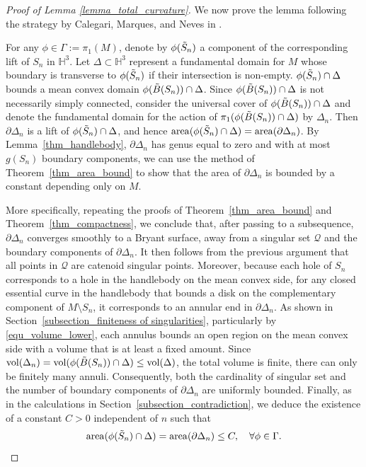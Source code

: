 \documentclass[12pt,a4paper]{amsart}
\numberwithin{equation}{section}
\theoremstyle{plain}
\theoremstyle{named}
\theoremstyle{definition}
\newcommand{\area}{{\rm{area}}}
\newcommand{\vol}{{\rm{vol}}}
\begin{document}
\begin{proof}[Proof of Lemma \ref{lemma_total_curvature}]
We now prove the lemma following the strategy by Calegari, Marques, and Neves in \cite[Section 6]{Calegari-Marques-Neves}.

For any $\phi\in \Gamma:=\pi_1(M)$, denote by $\phi(\Tilde{S}_n)$ a component of the corresponding lift of $S_n$ in $\mathbb{H}^3$. Let $\Delta\subset \mathbb{H}^3$ represent a fundamental domain for $M$ whose boundary is transverse to $\phi(\Tilde{S}_n)$ if their intersection is non-empty. $\phi(\Tilde{S}_n)\cap\Delta$ bounds a mean convex domain $\phi(\Tilde{B}(S_n))\cap\Delta$. Since  $\phi(\Tilde{B}(S_n))\cap\Delta$ is not necessarily simply connected, consider the universal cover of $\phi(\Tilde{B}(S_n))\cap\Delta$ and denote the fundamental domain for the action of $\pi_1(\phi(\Tilde{B}(S_n))\cap\Delta)$ by $\Delta_n$. Then $\partial\Delta_n$ is a lift of $\phi(\Tilde{S}_n)\cap\Delta$, and hence $\area(\phi(\Tilde{S}_n)\cap\Delta)=\area(\partial \Delta_n)$.
By Lemma~\ref{thm_handlebody}, $\partial\Delta_n$ has genus equal to zero and with at most $g(S_n)$ boundary components, we can use the method of Theorem~\ref{thm_area_bound} to show that the area of $\partial \Delta_n$ is bounded by a constant depending only on $M$.

More specifically, repeating the proofs of Theorem~\ref{thm_area_bound} and Theorem~\ref{thm_compactness}, we conclude that, after passing to a subsequence, $\partial \Delta_n$ converges smoothly to a Bryant surface, away from a singular set $\mathcal{Q}$ and the boundary components of $\partial\Delta_n$. It then follows from the previous argument that all points in $\mathcal{Q}$ are catenoid singular points. 
Moreover, because each hole of $S_n$ corresponds to a hole in the handlebody on the mean convex side, for any closed essential curve in the handlebody that bounds a disk on the complementary component of $M\setminus S_n$, it corresponds to an annular end in $\partial \Delta_n$. 
As shown in Section~\ref{subsection_finiteness of singularities}, particularly by \eqref{equ_volume_lower}, each annulus bounds an open region on the mean convex side with a volume that is at least a fixed amount. Since $\vol(\Delta_n)=\vol(\phi(\Tilde{B}(S_n))\cap\Delta)\leq \vol(\Delta)$, the total volume is finite, 
there can only be finitely many annuli. Consequently, both the cardinality of singular set and the number of boundary components of $\partial\Delta_n$ are uniformly bounded. 
Finally, as in the calculations in Section~\ref{subsection_contradiction}, we deduce the existence of a constant $C>0$ independent of $n$ such that \begin{equation*}
        \area(\phi(\Tilde{S}_n)\cap \Delta)=\area(\partial\Delta_n)\leq C,\quad \forall \phi\in \Gamma.
    \end{equation*}
    

\end{proof}
\end{document}
